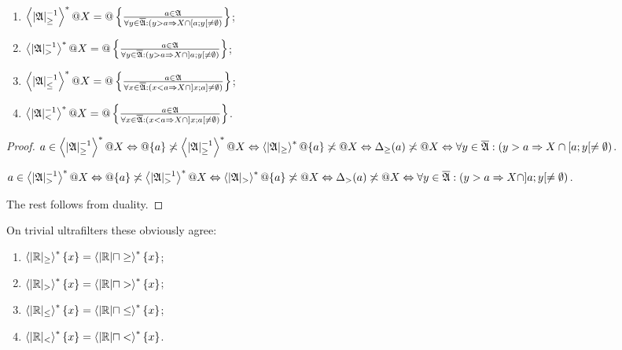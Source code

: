 \begin{prop}
~
\begin{enumerate}
\item $\left\langle |\mathfrak{A}|_{\geq}^{-1}\right\rangle ^{\ast}@X = @\left\{ \frac{a\in\mathfrak{A}}{\forall y\in\overline{\mathfrak{A}}:(y>a \Rightarrow X\cap[a;y[\ne\emptyset)}\right\}$;
\item $\left\langle |\mathfrak{A}|_{>}^{-1}\right\rangle ^{\ast}@X = @\left\{ \frac{a\in\mathfrak{A}}{\forall y\in\overline{\mathfrak{A}}:(y>a \Rightarrow X\cap]a;y[\ne\emptyset)}\right\}$;
\item $\left\langle |\mathfrak{A}|_{\leq}^{-1}\right\rangle ^{\ast}@X = @\left\{ \frac{a\in\mathfrak{A}}{\forall x\in\overline{\mathfrak{A}}:(x<a \Rightarrow X\cap]x;a]\ne\emptyset)}\right\}$;
\item $\left\langle |\mathfrak{A}|_{<}^{-1}\right\rangle ^{\ast}@X = @\left\{ \frac{a\in\mathfrak{A}}{\forall x\in\overline{\mathfrak{A}}:(x<a \Rightarrow X\cap]x;a[\ne\emptyset)}\right\}$.
\end{enumerate}
\end{prop}

\begin{proof}
$a\in\left\langle |\mathfrak{A}|_{\geq}^{-1}\right\rangle ^{\ast}@X \Leftrightarrow
@\{a\} \not\asymp \left\langle |\mathfrak{A}|_{\geq}^{-1}\right\rangle ^{\ast}@X \Leftrightarrow
\left\langle |\mathfrak{A}|_{\geq}\right\rangle ^{\ast}@\{a\} \not\asymp @X \Leftrightarrow
\Delta_{\geq}(a) \not\asymp @X \Leftrightarrow
\forall y\in\overline{\mathfrak{A}}:(y>a \Rightarrow X\cap[a;y[\ne\emptyset)$.

$a\in\left\langle |\mathfrak{A}|_{>}^{-1}\right\rangle ^{\ast}@X \Leftrightarrow
@\{a\} \not\asymp \left\langle |\mathfrak{A}|_{>}^{-1}\right\rangle ^{\ast}@X \Leftrightarrow
\left\langle |\mathfrak{A}|_{>}\right\rangle ^{\ast}@\{a\} \not\asymp @X \Leftrightarrow
\Delta_{>}(a) \not\asymp @X \Leftrightarrow
\forall y\in\overline{\mathfrak{A}}:(y>a \Rightarrow X\cap]a;y[\ne\emptyset)$.

The rest follows from duality.
\end{proof}

\begin{rem}
On trivial ultrafilters these obviously agree:
\begin{enumerate}
\item $\left\langle |\mathbb{R}|_{\geq}\right\rangle ^{\ast}\{x\} = \left\langle |\mathbb{R}| \sqcap \geq\right\rangle ^{\ast}\{x\}$;
\item $\left\langle |\mathbb{R}|_{>}\right\rangle ^{\ast}\{x\} = \left\langle |\mathbb{R}| \sqcap >\right\rangle ^{\ast}\{x\}$;
\item $\left\langle |\mathbb{R}|_{\leq}\right\rangle ^{\ast}\{x\} = \left\langle |\mathbb{R}| \sqcap \leq\right\rangle ^{\ast}\{x\}$;
\item $\left\langle |\mathbb{R}|_{<}\right\rangle ^{\ast}\{x\} = \left\langle |\mathbb{R}| \sqcap <\right\rangle ^{\ast}\{x\}$.
\end{enumerate}
\end{rem}

